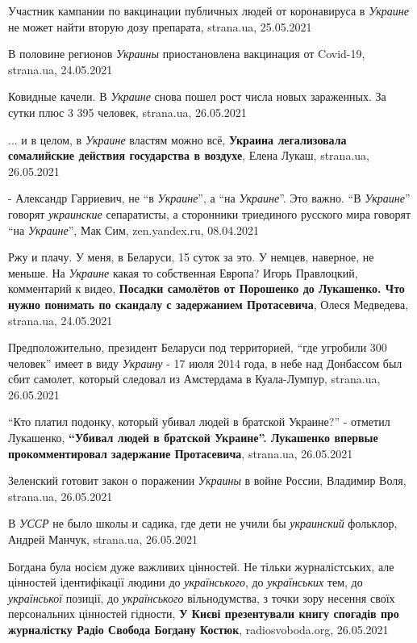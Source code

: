 Участник кампании по вакцинации публичных людей от коронавируса в \emph{Украине} не
может найти вторую дозу препарата, strana.ua, 25.05.2021

В половине регионов \emph{Украины} приостановлена вакцинация от Covid-19,
strana.ua, 24.05.2021

Ковидные качели. В \emph{Украине} снова пошел рост числа новых зараженных. За
сутки плюс 3 395 человек, strana.ua, 26.05.2021

... и в целом, в \emph{Украине} властям можно всё, \textbf{Украина легализовала
сомалийские действия государства в воздухе}, Елена Лукаш, strana.ua, 26.05.2021

- Александр Гарриевич, не \enquote{в \emph{Украине}}, а \enquote{на
\emph{Украине}}. Это важно. \enquote{В \emph{Украине}} говорят
\emph{украинские} сепаратисты, а сторонники триединого русского мира говорят
\enquote{на \emph{Украине}}, Мак Сим, zen.yandex.ru, 08.04.2021

Ржу и плачу. У меня, в Беларуси, 15 суток за это. У немцев, наверное, не
меньше. На \emph{Украине} какая то собственная Европа?
Игорь Правлоцкий, комментарий к видео, \textbf{Посадки
самолётов от Порошенко до Лукашенко. Что нужно понимать по скандалу с
задержанием Протасевича}, Олеся Медведева, strana.ua, 24.05.2021

Предположительно, президент Беларуси под территорией, \enquote{где угробили 300
человек} имеет в виду \emph{Украину} - 17 июля 2014 года, в небе над Донбассом был
сбит самолет, который следовал из Амстердама в Куала-Лумпур, strana.ua, 26.05.2021

\enquote{Кто платил подонку, который убивал людей в братской Украине?} -
отметил Лукашенко, \textbf{\enquote{Убивал людей в братской Украине}. Лукашенко
впервые прокомментировал задержание Протасевича}, strana.ua, 26.05.2021

Зеленский готовит закон о поражении \emph{Украины} в войне России, Владимир
Воля, strana.ua, 26.05.2021

В \emph{УССР} не было школы и садика, где дети не учили бы \emph{украинский}
фольклор, Андрей Манчук, strana.ua, 26.05.2021

Богдана була носієм дуже важливих цінностей. Не тільки журналістських, але
цінностей ідентифікації людини до \emph{українського}, до \emph{українських}
тем, до \emph{української} позиції, до \emph{українського} вільнодумства, з
точки зору несення своїх персональних цінностей гідности, \textbf{У Києві
презентували книгу спогадів про журналістку Радіо Свобода Богдану Костюк},
radiosvoboda.org, 26.05.2021

